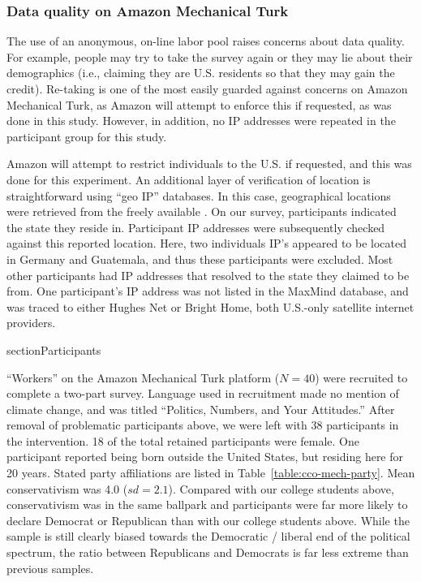 \subsubsection{Data quality on Amazon Mechanical Turk}
\label{sec:mturk-problems}

The use of an anonymous, on-line labor pool raises concerns about data quality.
For example, people may try to take the survey again or they may lie about their
demographics (i.e., claiming they are U.S. residents so that they may gain the
credit). Re-taking is one of the most easily guarded against concerns on Amazon
Mechanical Turk, as Amazon will attempt to enforce this if requested, as was
done in this study. However, in addition, no IP addresses were repeated in the
participant group for this study.

Amazon will attempt to restrict individuals to the U.S. if requested, and this
was done for this experiment. An additional layer of verification of location is
straightforward using “geo IP” databases. In this case, geographical locations
were retrieved from the freely available \textcite{maxmind-database}. On our
survey, participants indicated the state they reside in. Participant IP
addresses were subsequently checked against this reported location. Here, two
individuals IP’s appeared to be located in Germany and Guatemala, and thus these
participants were excluded. Most other participants had IP addresses that
resolved to the state they claimed to be from. One participant’s IP address was
not listed in the MaxMind database, and was traced to either Hughes Net or
Bright Home, both U.S.-only satellite internet providers.

section{Participants}
\label{sec:CCO-ndi-participants}

“Workers” on the Amazon Mechanical Turk platform ($N=40$) were recruited to
complete a two-part survey. Language used in recruitment made no mention of
climate change, and was titled “Politics, Numbers, and Your Attitudes.” After
removal of problematic participants above, we were left with 38 participants in
the intervention. 18 of the total retained participants were female. One
participant reported being born outside the United States, but residing here for
20 years. Stated party affiliations are listed in
Table~\ref{table:cco-mech-party}. Mean conservativism was 4.0 ($sd=2.1$).
Compared with our college students above, conservativism was in the same
ballpark and participants were far more likely to declare Democrat or Republican
than with our college students above. While the sample is still clearly biased
towards the Democratic / liberal end of the political spectrum, the ratio
between Republicans and Democrats is far less extreme than previous samples. 

